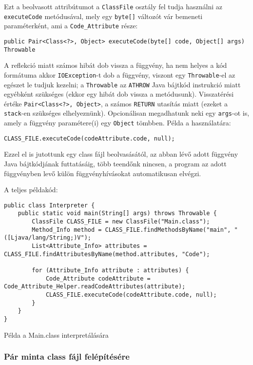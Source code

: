 Ezt a beolvasott attribútumot a \lstinline{ClassFile} osztály fel tudja használni az \lstinline{executeCode} metódusával, mely egy \lstinline{byte[]} változót vár bemeneti paraméterként, ami a \lstinline{Code_Attribute} része:
\begin{verbatim}
public Pair<Class<?>, Object> executeCode(byte[] code, Object[] args) Throwable
\end{verbatim}
A reflekció miatt számos hibát dob vissza a függvény, ha nem helyes a kód formátuma akkor \lstinline{IOException}-t dob a függvény, viszont egy \lstinline{Throwable}-el az egészet le tudjuk kezelni; a \lstinline{Throwable} az \lstinline{ATHROW} Java bájtkód instrukció miatt egyébként szükséges (ekkor egy hibát dob vissza a metódusunk).
Visszatérési értéke \lstinline{Pair<Class<?>, Object>}, a számos \lstinline{RETURN} utasítás miatt (ezeket a \lstinline{stack}-en szükséges elhelyeznünk).
Opcionálisan megadhatunk neki egy \lstinline{args}-ot is, amely a függvény paramétere(i) egy \lstinline{Object} tömbben.
Példa a használatára:
\begin{verbatim}
CLASS_FILE.executeCode(codeAttribute.code, null);
\end{verbatim}

Ezzel el is jutottunk egy class fájl beolvasásától, az abban lévő adott függvény Java bájtkódjának futtatásáig, több teendőnk nincsen, a program az adott függvényben levő külön függvényhívásokat automatikusan elvégzi.

\begin{listing}[H]
A teljes példakód:
\begin{verbatim}
public class Interpreter {
	public static void main(String[] args) throws Throwable {
		ClassFile CLASS_FILE = new ClassFile("Main.class");
		Method_Info method = CLASS_FILE.findMethodsByName("main", "([Ljava/lang/String;)V");
		List<Attribute_Info> attributes = CLASS_FILE.findAttributesByName(method.attributes, "Code");

		for (Attribute_Info attribute : attributes) {
			Code_Attribute codeAttribute = Code_Attribute_Helper.readCodeAttributes(attribute);
			CLASS_FILE.executeCode(codeAttribute.code, null);
		}
	}
}
\end{verbatim}
\caption{Példa a Main.class interpretálására}
\end{listing}

\subsubsection{Pár minta class fájl felépítésére}

